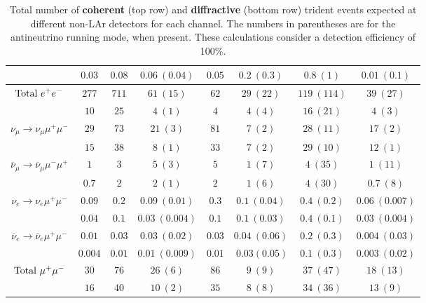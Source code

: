 \begin{table}[h]
\begin{center}
{\begin{tabular}{|cccccccc|}
    &$0.03$ &$0.08$ &$0.06~(0.04)$ &$0.05$&$0.2~(0.3)$ &$0.8~(1)$& $0.01~(0.1)$\\\hline
    \hline\hline
    ${\rm{Total}}\  e^+ e^-$& $277$ &$711$ &$61~(15)$ &$62$&$29~(22)$ &$119~(114)$& $39~(27)$\\
    &$10$ &$25$ &$4~(1)$ &$4$&$4~(4)$ &$16~(21)$& $4~(3)$\\\hline
    \hline    
    		$\nu_\mu\to\nu_\mu \mu^+ \mu^-$& $29$ &$73$ &$21~(3)$ &$81$&$7~(2)$ &$28~(11)$& $17~(2)$ \\
        &$15$ &$38$ &$8~(1)$ &$33$&$7~(2)$ &$29~(10)$& $12~(1)$\\\hline
        $\overline\nu_\mu\to\overline\nu_\mu \mu^- \mu^+$& $1$ &$3$ &$5~(3)$&$5$ &$1~(7)$ &$4~(35)$& $1~(11)$\\
        &$0.7$ &$2$ &$2~(1)$ &$2$&$1~(6)$ &$4~(30)$& $0.7~(8)$\\\hline
 $\nu_e\to\nu_e \mu^+ \mu^-$    &$0.09$ &$0.2$ &$0.09~(0.01)$&$0.3$ &$0.1~(0.04)$ &$0.4~(0.2)$& $0.06~(0.007)$\\  
 &$0.04$ &$0.1$ &$0.03~(0.004)$ &$0.1$&$0.1~(0.03)$ &$0.4~(0.1)$& $0.03~(0.004)$\\\hline
        $\overline\nu_e\to\overline\nu_e \mu^+ \mu^-$&$0.01$ &$0.03$ &$0.03~(0.02)$ &$0.03$&$0.04~(0.06)$&$0.2~(0.3)$ & $0.004~(0.03)$\\
        &$0.004$ &$0.01$ &$0.01~(0.009)$ &$0.01$&$~0.03(0.05)$  &$0.1~(0.3)$ & $0.003~(0.02)$\\\hline
        \hline \hline
    ${\rm{Total}} \ \mu^+ \mu^-$ &$30$ &$76$ &$26~(6)$&$86$ &$9~(9)$ &$37~(47)$ & $18~(13)$ \\
    &$16$ &$40$ &$10~(2)$ &$35$&$8~(8)$ &$34~(36)$ & $13~(9)$\\
    \hline\hline
\end{tabular}}
\end{center}
\caption{\label{tab:otherrates}Total number of \textbf{coherent} (top row) and \textbf{diffractive} (bottom row) trident events expected at different non-LAr detectors for each channel. The numbers in parentheses are for the antineutrino running mode, when present. These calculations consider a detection efficiency of 100\%.}
\end{table}